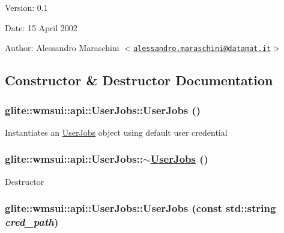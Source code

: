 \begin{Desc}
\item[Version:]0.1 \end{Desc}
\begin{Desc}
\item[Date:]15 April 2002 \end{Desc}
\begin{Desc}
\item[Author:]Alessandro Maraschini $<$\href{mailto:alessandro.maraschini@datamat.it}{\tt alessandro.maraschini@datamat.it}$>$ \end{Desc}




\subsection{Constructor \& Destructor Documentation}
\hypertarget{classglite_1_1wmsui_1_1api_1_1UserJobs_z27_0}{
\subsubsection[UserJobs]{\setlength{\rightskip}{0pt plus 5cm}glite::wmsui::api::User\-Jobs::User\-Jobs ()}}
\label{classglite_1_1wmsui_1_1api_1_1UserJobs_z27_0}


Instantiates an \hyperlink{classglite_1_1wmsui_1_1api_1_1UserJobs}{User\-Jobs} object using default user credential \hypertarget{classglite_1_1wmsui_1_1api_1_1UserJobs_z27_1}{
\subsubsection[$\sim$UserJobs]{\setlength{\rightskip}{0pt plus 5cm}glite::wmsui::api::User\-Jobs::$\sim$\hyperlink{classglite_1_1wmsui_1_1api_1_1UserJobs}{User\-Jobs} ()}}
\label{classglite_1_1wmsui_1_1api_1_1UserJobs_z27_1}


Destructor \hypertarget{classglite_1_1wmsui_1_1api_1_1UserJobs_z27_2}{
\subsubsection[UserJobs]{\setlength{\rightskip}{0pt plus 5cm}glite::wmsui::api::User\-Jobs::User\-Jobs (const std::string {\em cred\_\-path})}}
\label{classglite_1_1wmsui_1_1api_1_1UserJobs_z27_2}


